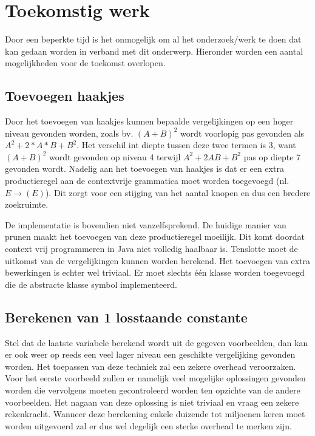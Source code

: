 \documentclass[Main.tex]{subfiles}
\begin{document}
\section{Toekomstig werk}
Door een beperkte tijd is het onmogelijk om al het onderzoek/werk te doen dat kan gedaan worden in verband met dit onderwerp. Hieronder worden een aantal mogelijkheden voor de toekomst overlopen.

\subsection{Toevoegen haakjes}
Door het toevoegen van haakjes kunnen bepaalde vergelijkingen op een hoger niveau gevonden worden, zoals bv. $(A+B)^2$ wordt voorlopig pas gevonden als $A^{2}+2 \ast A \ast B+B^{2}$. Het verschil int diepte tussen deze twee termen is 3, want $(A+B)^2$ wordt gevonden op niveau 4 terwijl $A^{2}+2AB+B^{2}$ pas op diepte 7 gevonden wordt. Nadelig aan het toevoegen van haakjes is dat er een extra productieregel aan de contextvrije grammatica moet worden toegevoegd (nl. $E \rightarrow (E)$). Dit zorgt voor een stijging van het aantal knopen en dus een bredere zoekruimte. 

\par De implementatie is bovendien niet vanzelfsprekend. De huidige manier van prunen maakt het toevoegen van deze productieregel moeilijk. Dit komt doordat context vrij programmeren in Java niet volledig haalbaar is. Tenslotte moet de uitkomst van de vergelijkingen kunnen worden berekend. Het toevoegen van extra bewerkingen is echter wel triviaal. Er moet slechts \'e\'en klasse worden toegevoegd die de abstracte klasse symbol implementeerd.

\subsection{Berekenen van 1 losstaande constante}
Stel dat de laatste variabele berekend wordt uit de gegeven voorbeelden, dan kan er ook weer op reeds een veel lager niveau een geschikte vergelijking gevonden worden. Het toepassen van deze techniek zal een zekere overhead veroorzaken. Voor het eerste voorbeeld zullen er namelijk veel mogelijke oplossingen gevonden worden die vervolgens moeten gecontroleerd worden ten opzichte van de andere voorbeelden. Het nagaan van deze oplossing is niet triviaal en vraag een zekere rekenkracht. Wanneer deze berekening enkele duizende tot miljoenen keren moet worden uitgevoerd zal er dus wel degelijk een sterke overhead te merken zijn.
\end{document}
